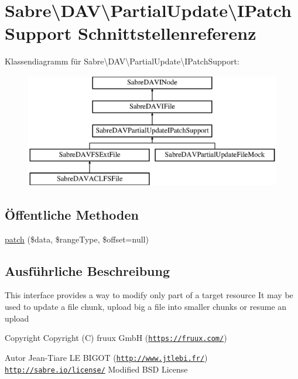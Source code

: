 \hypertarget{interface_sabre_1_1_d_a_v_1_1_partial_update_1_1_i_patch_support}{}\section{Sabre\textbackslash{}D\+AV\textbackslash{}Partial\+Update\textbackslash{}I\+Patch\+Support Schnittstellenreferenz}
\label{interface_sabre_1_1_d_a_v_1_1_partial_update_1_1_i_patch_support}
Klassendiagramm für Sabre\textbackslash{}D\+AV\textbackslash{}Partial\+Update\textbackslash{}I\+Patch\+Support\+:\begin{figure}[H]
\begin{center}
\leavevmode
\includegraphics[height=5.000000cm]{interface_sabre_1_1_d_a_v_1_1_partial_update_1_1_i_patch_support}
\end{center}
\end{figure}
\subsection*{Öffentliche Methoden}
\begin{DoxyCompactItemize}
\item 
\mbox{\hyperlink{interface_sabre_1_1_d_a_v_1_1_partial_update_1_1_i_patch_support_a30ad366876434b6d36f93c4143a8a323}{patch}} (\$data, \$range\+Type, \$offset=null)
\end{DoxyCompactItemize}


\subsection{Ausführliche Beschreibung}
This interface provides a way to modify only part of a target resource It may be used to update a file chunk, upload big a file into smaller chunks or resume an upload

\begin{DoxyCopyright}{Copyright}
Copyright (C) fruux GmbH (\href{https://fruux.com/}{\tt https\+://fruux.\+com/}) 
\end{DoxyCopyright}
\begin{DoxyAuthor}{Autor}
Jean-\/\+Tiare LE B\+I\+G\+OT (\href{http://www.jtlebi.fr/}{\tt http\+://www.\+jtlebi.\+fr/})  \href{http://sabre.io/license/}{\tt http\+://sabre.\+io/license/} Modified B\+SD License 
\end{DoxyAuthor}


